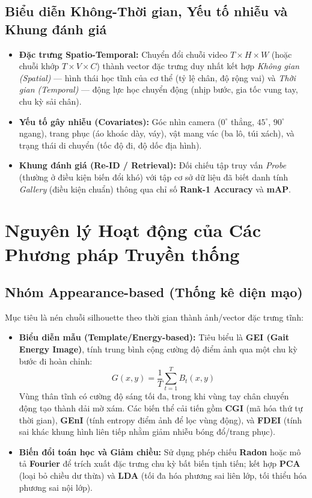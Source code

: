 \documentclass[11pt, a4paper]{article}
\begin{document}
\subsection{Biểu diễn Không-Thời gian, Yếu tố nhiễu và Khung đánh giá}
\begin{itemize}
    \item \textbf{Đặc trưng Spatio-Temporal:} Chuyển đổi chuỗi video $T \times H \times W$ (hoặc chuỗi khớp $T \times V \times C$) thành vector đặc trưng duy nhất kết hợp \textit{Không gian (Spatial)} — hình thái học tĩnh của cơ thể (tỷ lệ chân, độ rộng vai) và \textit{Thời gian (Temporal)} — động lực học chuyển động (nhịp bước, gia tốc vung tay, chu kỳ sải chân).
    \item \textbf{Yếu tố gây nhiễu (Covariates):} Góc nhìn camera ($0^\circ$ thẳng, $45^\circ$, $90^\circ$ ngang), trang phục (áo khoác dày, váy), vật mang vác (ba lô, túi xách), và trạng thái di chuyển (tốc độ đi, độ dốc địa hình).
    \item \textbf{Khung đánh giá (Re-ID / Retrieval):} Đối chiếu tập truy vấn \textit{Probe} (thường ở điều kiện biến đổi khó) với tập cơ sở dữ liệu đã biết danh tính \textit{Gallery} (điều kiện chuẩn) thông qua chỉ số \textbf{Rank-1 Accuracy} và \textbf{mAP}.
\end{itemize}

\section{Nguyên lý Hoạt động của Các Phương pháp Truyền thống}

\subsection{Nhóm Appearance-based (Thống kê diện mạo)}
Mục tiêu là nén chuỗi silhouette theo thời gian thành ảnh/vector đặc trưng tĩnh:
\begin{itemize}
    \item \textbf{Biểu diễn mẫu (Template/Energy-based):} Tiêu biểu là \textbf{GEI (Gait Energy Image)}, tính trung bình cộng cường độ điểm ảnh qua một chu kỳ bước đi hoàn chỉnh:
    \begin{equation}
        G(x, y) = \frac{1}{T} \sum_{t=1}^T B_t(x, y)
    \end{equation}
    Vùng thân tĩnh có cường độ sáng tối đa, trong khi vùng tay chân chuyển động tạo thành dải mờ xám. Các biến thể cải tiến gồm \textbf{CGI} (mã hóa thứ tự thời gian), \textbf{GEnI} (tính entropy điểm ảnh để lọc vùng động), và \textbf{FDEI} (tính sai khác khung hình liên tiếp nhằm giảm nhiễu bóng đổ/trang phục).
    \item \textbf{Biến đổi toán học và Giảm chiều:} Sử dụng phép chiếu \textbf{Radon} hoặc mô tả \textbf{Fourier} để trích xuất đặc trưng chu kỳ bất biến tịnh tiến; kết hợp \textbf{PCA} (loại bỏ chiều dư thừa) và \textbf{LDA} (tối đa hóa phương sai liên lớp, tối thiểu hóa phương sai nội lớp).
\end{itemize}
\end{document}

